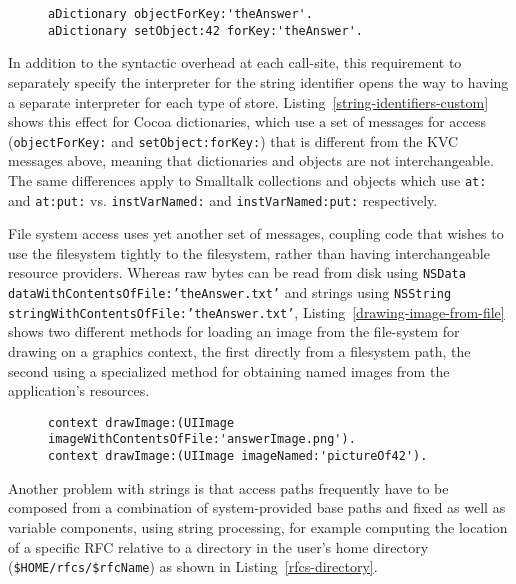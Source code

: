 \documentclass[preprint,authoryear]{llncs}
\begin{document}
\begin{figure}[htbp]
\begin{lstlisting}[style=numbers,label=string-identifiers-custom,caption=Retrieve and store value with custom stores.]
aDictionary objectForKey:'theAnswer'.
aDictionary setObject:42 forKey:'theAnswer'.
\end{lstlisting}
\end{figure}



In addition to the syntactic overhead at each call-site, this requirement to separately specify the interpreter
for the string identifier opens the way to having a separate interpreter for each type of store. 
Listing~\ref{string-identifiers-custom} shows this effect for Cocoa dictionaries, which use a set of messages for
access ({\tt objectForKey:} and {\tt setObject:forKey:}) that is different from the KVC messages above, meaning
 that dictionaries and objects are not interchangeable.  
The same differences apply to Smalltalk collections and objects which use {\tt at:} and {\tt at:put:} vs. {\tt instVarNamed:} and {\tt instVarNamed:put:}
respectively.

File system access uses yet another set of messages, coupling code that wishes to use the filesystem tightly to the filesystem,
rather than having interchangeable resource providers.  Whereas raw bytes can be read from disk using
{\tt NSData dataWithContentsOfFile:'theAnswer.txt'} and strings using 
{\tt NSString stringWithContentsOfFile:'theAnswer.txt'},  Listing~\ref{drawing-image-from-file} shows two different methods
for loading an image from the file-system for drawing on a graphics context, the first directly from a filesystem path,
the second using a specialized method for obtaining named images from the application's resources.



\begin{figure}[htbp]
\begin{lstlisting}[style=numbers,label=drawing-image-from-file,caption=Drawing an image stored in a file.]
context drawImage:(UIImage imageWithContentsOfFile:'answerImage.png').
context drawImage:(UIImage imageNamed:'pictureOf42').
\end{lstlisting}
\end{figure}


Another problem with strings is that access paths frequently have to be composed from a combination of system-provided base paths
and fixed as well as variable components, using string processing, for example computing the location of a specific RFC relative
to a directory in the user's home directory  ({\tt \$HOME/rfcs/\$rfcName}) as shown in Listing~\ref{rfcs-directory}.
\end{document}
